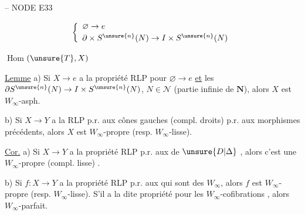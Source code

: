  -- NODE E33




\[
\left\{\begin{array}{l}
\varnothing\to e\\[2pt]
\partial\times S^{\unsure{n}}(N)\to I\times S^{\unsure{n}}(N)
\end{array}\right.
\]

\uline{$\operatorname{Hom}$}$(\unsure{T},X)$

\uline{Lemme} a) Si $X\to e$ a la propriété RLP  pour $\varnothing\to e$ \uline{et} les $\partial S^{\unsure{n}}(N)\to I\times S^{\unsure{n}}(N)$, $N\in\mathcal N$ (partie infinie de $\mathbf N$), alors $X$ est $W_\infty$-asph.

b) Si $X\to Y$ a la RLP p.r. aux cônes gauches (compl. droits) p.r. aux morphismes précédents, alors $X$ est $W_\infty$-propre (resp. $W_\infty$-lisse).

\uline{Cor.} a) Si $X\to Y$ a la propriété RLP p.r. aux  de $\unsure{D|\Delta}$    , alors c'est une  $W_\infty$-propre (compl. lisse) .

b) Si $f\colon X\to Y$ a la propriété RLP p.r. aux     qui sont des $W_\infty$, alors $f$ est $W_\infty$-propre (resp. $W_\infty$-lisse).
S'il a la dite propriété pour les $W_\infty$-cofibrations  , alors  $W_\infty$-parfait.

